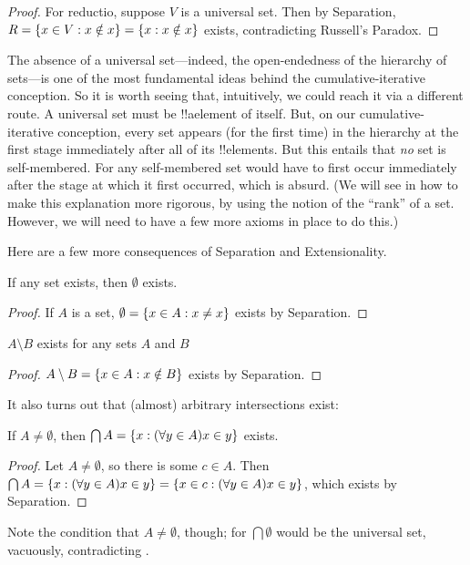 \documentclass[../../../include/open-logic-section]{subfiles}
\begin{document}
\begin{proof}
For reductio, suppose $V$ is a universal set. Then by Separation, $R =
\{ x \in V : x \notin x \} = \{ x : x \notin x \}$ exists,
contradicting Russell's Paradox.
\end{proof}

The absence of a universal set---indeed, the open-endedness of the
hierarchy of sets---is one of the most fundamental ideas behind the
cumulative-iterative conception. So it is worth seeing that,
intuitively, we could reach it via a different route. A universal set
must be !!a{element} of itself. But, on our cumulative-iterative
conception, every set appears (for the first time) in the hierarchy at
the first stage immediately after all of its !!{element}s. But this
entails that \emph{no} set is self-membered. For any self-membered set
would have to first occur immediately after the stage at which it
first occurred, which is absurd. (We will see in
 how to make this explanation
more rigorous, by using the notion of the ``rank'' of a set. However,
we will need to have a few more axioms in place to do this.)

Here are a few more consequences of Separation and Extensionality.

\begin{prop}
If any set exists, then $\emptyset$ exists.
\end{prop}

\begin{proof}
If $A$ is a set, $\emptyset = \{ x \in A : x \neq x \}$ exists by Separation.
\end{proof}

\begin{prop}
$A \setminus B$ exists for any sets $A$ and $B$
\end{prop}

\begin{proof}
$A \setminus B = \{ x \in A : x \notin B \}$ exists by Separation.
\end{proof}

It also turns out that (almost) arbitrary intersections exist:

\begin{prop}
If $A \neq \emptyset$, then $\bigcap A = \{ x : (\forall y \in A)x \in y \}$ exists.
\end{prop}

\begin{proof}
Let $A \neq \emptyset$, so there is some $c \in A$. Then $\bigcap A =
\{ x : (\forall y \in A)x \in y \} = \{ x \in c : (\forall y \in
A)x \in y \}$, which exists by Separation.
\end{proof}

Note the condition that $A \neq \emptyset$, though; for $\bigcap
\emptyset$ would be the universal set, vacuously, contradicting
.
\end{document}
